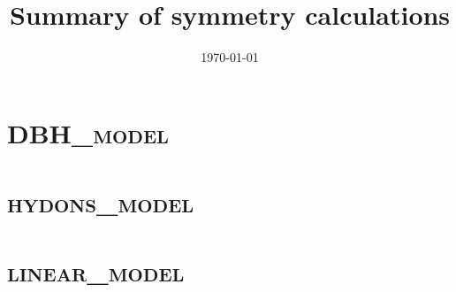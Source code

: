 \documentclass{book}
\begin{document}
\title{\textbf{Summary of symmetry calculations}}
\date{\today}
\maketitle
\tableofcontents
\clearpage
\chapter{\textsc{DBH\_model}}


\chapter{\textsc{hydons\_model}}


\chapter{\textsc{linear\_model}}

\end{document}
